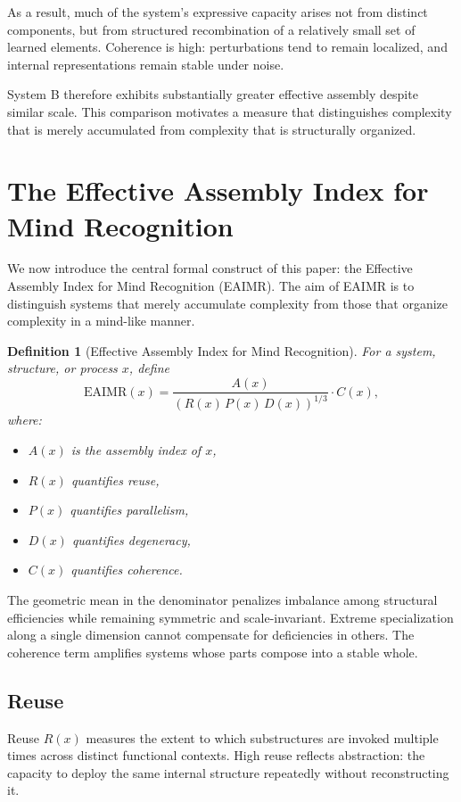 \documentclass[11pt,letterpaper]{article}
\newtheorem{definition}{Definition}
\begin{document}
As a result, much of the system’s expressive capacity arises not from distinct components, but from structured recombination of a relatively small set of learned elements. Coherence is high: perturbations tend to remain localized, and internal representations remain stable under noise.

System B therefore exhibits substantially greater effective assembly despite similar scale. This comparison motivates a measure that distinguishes complexity that is merely accumulated from complexity that is structurally organized.

\section{The Effective Assembly Index for Mind Recognition}

We now introduce the central formal construct of this paper: the Effective Assembly Index for Mind Recognition (EAIMR). The aim of EAIMR is to distinguish systems that merely accumulate complexity from those that organize complexity in a mind-like manner.

\begin{definition}[Effective Assembly Index for Mind Recognition]
For a system, structure, or process $x$, define
\[
\mathrm{EAIMR}(x)
=
\frac{A(x)}{\left(R(x)\,P(x)\,D(x)\right)^{1/3}} \cdot C(x),
\]
where:
\begin{itemize}
\item $A(x)$ is the assembly index of $x$,
\item $R(x)$ quantifies reuse,
\item $P(x)$ quantifies parallelism,
\item $D(x)$ quantifies degeneracy,
\item $C(x)$ quantifies coherence.
\end{itemize}
\end{definition}

The geometric mean in the denominator penalizes imbalance among structural efficiencies while remaining symmetric and scale-invariant. Extreme specialization along a single dimension cannot compensate for deficiencies in others. The coherence term amplifies systems whose parts compose into a stable whole.

\subsection{Reuse}

Reuse $R(x)$ measures the extent to which substructures are invoked multiple times across distinct functional contexts. High reuse reflects abstraction: the capacity to deploy the same internal structure repeatedly without reconstructing it.
\end{document}
